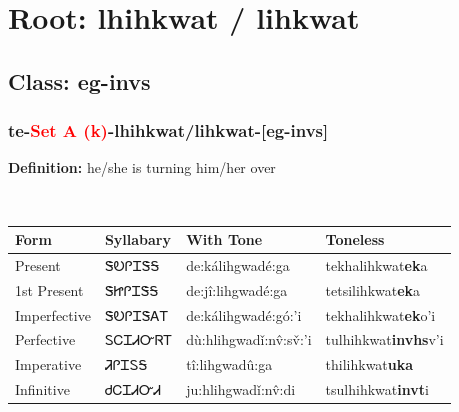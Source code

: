 \needspace{4in}
\section*{Root: lhihkwat / lihkwat}
\nopagebreak
{}
\needspace{3in}
\subsection*{Class: eg-invs}
\nopagebreak
\needspace{2in}
\subsubsection*{te{-}\textcolor{Red}{Set A (k)}{-}\textbf{lhihkwat/lihkwat}{-}[eg-invs]}
\nopagebreak
\textbf{Definition: } he/she is turning him/her over
\\[0.5em]
\begin{tabularx}{\textwidth}{l X X X}%
\toprule%
\textbf{Form}&\textbf{Syllabary}&\textbf{With Tone}&\textbf{Toneless}\\%
\midrule%
Present&ᏕᎧᎵᏆᏕᎦ&de:kálihgwadé:ga&tekhalihkwat\textbf{ek}a\\%
1st Present&ᏕᏥᎵᏆᏕᎦ&de:jî:lihgwadé:ga&tetsilihkwat\textbf{ek}a\\%
Imperfective&ᏕᎧᎵᏆᏕᎪᎢ&de:kálihgwadé:gó:’i&tekhalihkwat\textbf{ek}o'i\\%
Perfective&ᏚᏟᏆᏗᏅᏒᎢ&dù:hlihgwadǐ:nv̂:sv̌:’i&tulhihkwat\textbf{invhs}v'i\\%
Imperative&ᏘᎵᏆᏚᎦ&tî:lihgwadû:ga&thilihkwat\textbf{uka}\\%
Infinitive&ᏧᏟᏆᏗᏅᏗ&ju:hlihgwadǐ:nv̂:di&tsulhihkwat\textbf{invt}i\\%
\bottomrule%
\end{tabularx}
\\[1em]